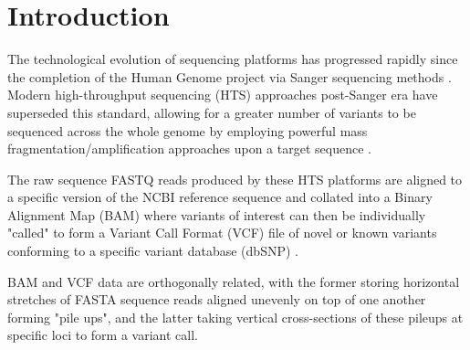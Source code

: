 
\section{Introduction}


The technological evolution of sequencing platforms has progressed rapidly since the completion of the Human Genome project via Sanger sequencing methods \citep{lander2001initial,sanger1977dna}. Modern high-throughput sequencing (HTS) approaches post-Sanger era have superseded this standard, allowing for a greater number of variants to be sequenced across the whole genome by employing powerful mass fragmentation/amplification approaches upon a target sequence \citep{lengauer2007bioinformatics,bockenhauer2012genetic}.


The raw sequence FASTQ reads produced by these HTS platforms are aligned to a specific version of the NCBI reference sequence and collated into a Binary Alignment Map (BAM) where variants of interest can then be individually "called" to form a Variant Call Format (VCF) file of novel or known variants conforming to a specific variant database (dbSNP) \citep{li2009sequence,danecek2011variant}.

BAM and VCF data are orthogonally related, with the former storing horizontal stretches of FASTA sequence reads aligned unevenly on top of one another forming "pile ups", and the latter taking vertical cross-sections of these pileups at specific loci to form a variant call.





